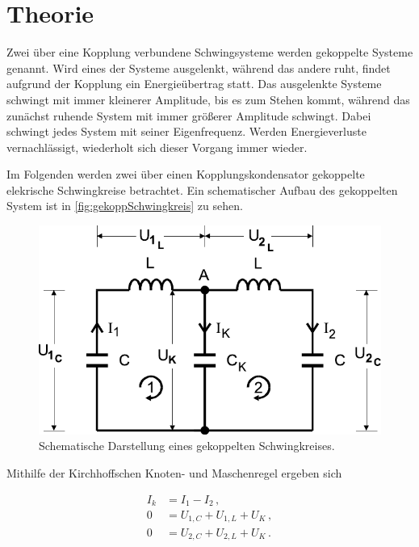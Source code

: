 \section{Theorie}
\label{sec:Theorie}

Zwei über eine Kopplung verbundene Schwingsysteme werden gekoppelte Systeme genannt.
Wird eines der Systeme ausgelenkt, während das andere ruht, findet aufgrund der Kopplung ein Energieübertrag statt. Das ausgelenkte Systeme schwingt mit immer kleinerer Amplitude, bis es zum Stehen kommt, während 
das zunächst ruhende System mit immer größerer Amplitude schwingt. Dabei schwingt jedes System mit seiner Eigenfrequenz. Werden Energieverluste vernachlässigt, wiederholt sich dieser Vorgang immer wieder.

Im Folgenden werden zwei über einen Kopplungskondensator gekoppelte elekrische Schwingkreise betrachtet. Ein schematischer Aufbau des gekoppelten System ist in \autoref{fig:gekoppSchwingkreis} zu sehen.

\begin{figure}[H]
    \centering
    \includegraphics{SchwingkreisAbb.pdf}
    \caption{Schematische Darstellung eines gekoppelten Schwingkreises\cite{ap04}.}
    \label{fig:gekoppSchwingkreis}
\end{figure}

\newpage

Mithilfe der Kirchhoffschen Knoten- und Maschenregel ergeben sich

\begin{align*}
    I_k &= I_1-I_2\, ,\\
    0   &= U_{1,C} + U_{1,L} + U_K\, , \\ 
    0   &= U_{2,C} + U_{2,L} + U_K\,.
\end{align*}

